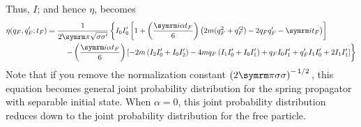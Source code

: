Thus, $I$; and hence $\eta$, becomes
\begin{equation}
    \eta(q_F, q_F'; t_F) = \begin{multlined}[t]
        \frac{1}{2\cpi\sqrt{\sigma\sigma'}}\left\{I_0I_0'\left[1 + \left(\frac{\im\alpha t_F}{6}\right)\left(2m(q_F^2 + q_F'^2) - 2q_Fq_F' - \im t_F\right)\right] \right. \\ \left.
        - \left(\frac{\im\alpha t_F}{6}\right) \left[-2m\left(I_2I_0' + I_0I_2'\right) - 4mq_F\left(I_1I_0' + I_0I_1'\right) + q_FI_0I_1' + q_F'I_1I_0' + 2I_1I_1' \right] \right\}
    \end{multlined}
\end{equation}
Note that if you remove the normalization constant $\left(2\cpi\sigma\sigma\right)^{-\flatfrac{1}{2}}$, this equation becomes general joint probability distribution for the spring propagator with separable initial state. When $\alpha = 0$, this joint probability distribution reduces down to the joint probability distribution for the free particle.

